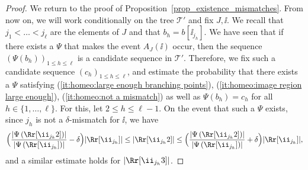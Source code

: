 \begin{proof}
We return to the proof of Proposition~\ref{prop_existence_mismatches}.
From now on, we will work conditionally on the tree $\mathcal{T'}$ and fix $J,\ii$.
We recall that $j_1<\dots<j_{\ell}$ are the elements of $J$ and that $b_h=b[\ii_{j_h}]$.
We have seen that if there exists a $\Psi$ that makes the event $A_J(\ii)$ occur, then the sequence $\left( \Psi(b_h) \right)_{1 \leq h \leq \ell}$ is a candidate sequence in $\mathcal{T}'$.
Therefore, we fix such a candidate sequence $(c_h)_{1 \leq h \leq \ell}$, and estimate the probability that there exists a $\Psi$ satisfying (\ref{it:homeo:large enough branching points}), (\ref{it:homeo:image region large enough}), (\ref{it:homeo:not a mismatch}) as well as $\Psi(b_h)=c_h$ for all $h\in\{1,\dots,\ell\}$.
For this, let $2 \leq h \leq \ell-1$.
On the event that such a $\Psi$ exists, since $j_h$ is not a $\delta$-mismatch for $\ii$, we have
\begin{equation}\label{eqn:absence_mismatch}
\Bigl( \frac{ \left| \Psi \left( \Rr[\ii_{j_h}2] \right) \right|}{\left| \Psi \left( \Rr[\ii_{j_h}] \right) \right|}-\delta \Bigr) |\Rr[\ii_{j_h}] | \leq \left| \Rr[\ii_{j_h}2] \right| \leq \Bigl( \frac{ \left| \Psi \left( \Rr[\ii_{j_h}2] \right) \right|}{\left| \Psi \left( \Rr[\ii_{j_h}] \right) \right|}+\delta \Bigr) |\Rr[\ii_{j_h}] |,
\end{equation}
and a similar estimate holds for $\left| \Rr[\ii_{j_h}3] \right|$.


\end{proof}
